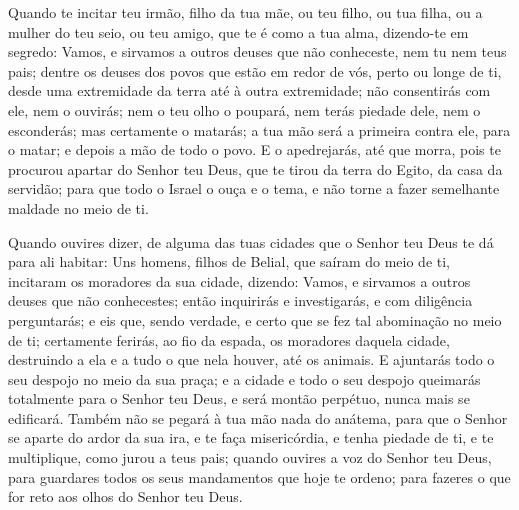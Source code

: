 Quando te incitar teu irmão, filho da tua mãe, ou teu filho, ou
tua filha, ou a mulher do teu seio, ou teu amigo, que te é como a
tua alma, dizendo-te em segredo: Vamos, e sirvamos a outros deuses
que não conheceste, nem tu nem teus pais; dentre os deuses dos
povos que estão em redor de vós, perto ou longe de ti, desde uma
extremidade da terra até à outra extremidade; não consentirás
com ele, nem o ouvirás; nem o teu olho o poupará, nem terás piedade
dele, nem o esconderás; mas certamente o matarás; a tua mão será
a primeira contra ele, para o matar; e depois a mão de todo o povo.
E o apedrejarás, até que morra, pois te procurou apartar do
Senhor teu Deus, que te tirou da terra do Egito, da casa da
servidão; para que todo o Israel o ouça e o tema, e não torne
a fazer semelhante maldade no meio de ti.

Quando ouvires dizer, de alguma das tuas cidades que o Senhor teu
Deus te dá para ali habitar: Uns homens, filhos de Belial,
que saíram do meio de ti, incitaram os moradores da sua cidade,
dizendo: Vamos, e sirvamos a outros deuses que não conhecestes;
então inquirirás e investigarás, e com diligência
perguntarás; e eis que, sendo verdade, e certo que se fez tal
abominação no meio de ti; certamente ferirás, ao fio da
espada, os moradores daquela cidade, destruindo a ela e a tudo o que
nela houver, até os animais. E ajuntarás todo o seu despojo
no meio da sua praça; e a cidade e todo o seu despojo queimarás
totalmente para o Senhor teu Deus, e será montão perpétuo, nunca
mais se edificará. Também não se pegará à tua mão nada do
anátema, para que o Senhor se aparte do ardor da sua ira, e te faça
misericórdia, e tenha piedade de ti, e te multiplique, como jurou a
teus pais; quando ouvires a voz do Senhor teu Deus, para
guardares todos os seus mandamentos que hoje te ordeno; para fazeres
o que for reto aos olhos do Senhor teu Deus.

\medskip

